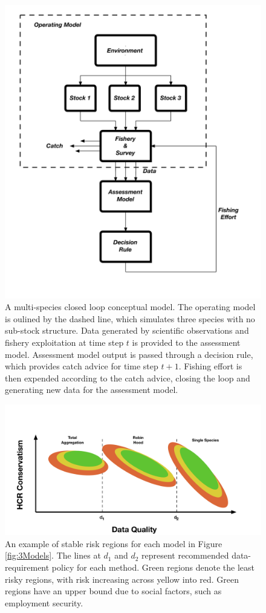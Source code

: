 \documentclass[]{scrartcl}
\begin{document}
\begin{figure}[htbp]
\centering
\includegraphics{figures/MSE.pdf}
\caption{A multi-species closed loop conceptual model. The operating model is oulined by the dashed line, which simulates three species with no sub-stock structure. Data generated by scientific observations and fishery exploitation at time step $t$ is provided to the assessment model. Assessment model output is passed through a decision rule, which provides catch advice for time step $t+1$. Fishing effort is then expended according to the catch advice, closing the loop and generating new data for the assessment model.}\label{fig:MSMSE}
\end{figure}\newpage

\begin{figure}[htbp]
\centering
\includegraphics{figures/stableRiskRegions.pdf}
\caption{An example of stable risk regions for each model in Figure \ref{fig:3Models}. The lines at $d_1$ and $d_2$ represent recommended data-requirement policy for each method. Green regions denote the least risky regions, with risk increasing across yellow into red. Green regions have an upper bound due to social factors, such as employment security.}\label{fig:MSMSE}
\end{figure}
\end{document}
